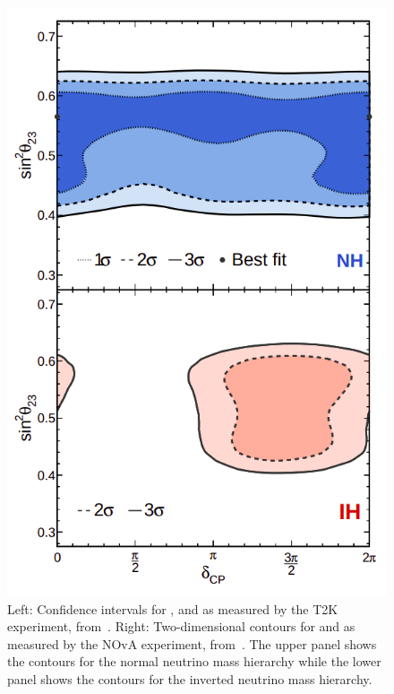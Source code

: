 \begin{figure}[h]
\begin{minipage}[t]{.49\linewidth}
		\includegraphics[width=.85\linewidth]{files/figures/theory/novaLimits}
	\end{minipage}
	\caption[Limits on various neutrino oscillation parameters from the T2K and NOvA experiments]{Left: Confidence intervals for \dcp,  and  as measured by the T2K experiment, from~\cite{t2kRecent}. Right: Two-dimensional contours for \dcp and  as measured by the NOvA experiment, from~\cite{novaRecent}. The upper panel shows the contours for the normal neutrino mass hierarchy while the lower panel shows the contours for the inverted neutrino mass hierarchy.}
    \label{fig:t2kLimits}
\end{figure}
